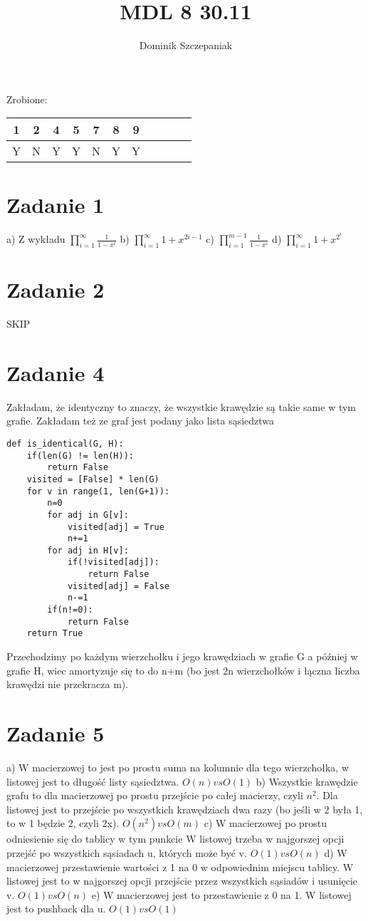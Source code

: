 \documentclass[12pt]{article}
\title{MDL 8 30.11}
\author{Dominik Szczepaniak}
\begin{document}
\maketitle
Zrobione:
\begin{tabular}{|| c c c c c c c c c c c||}
    \hline
    1 & 2 & 4 & 5 & 7 & 8 & 9   \\
    \hline
    Y & N & Y & Y & N & Y & Y 
\end{tabular}

\bgroup\obeylines
\section{Zadanie 1}
a) Z wykładu $\prod_{i=1}^{\infty} {\frac{1}{1-x^i}}$
b) $\prod_{i=1}^{\infty} {{1+x^{2i-1}}}$
c) $\prod_{i=1}^{m-1} {\frac{1}{1-x^i}}$
d) $\prod_{i=1}^{\infty} {{1+x^{2^i}}}$
\section{Zadanie 2}
SKIP
\section{Zadanie 4}
Zakładam, że identyczny to znaczy, że wszystkie krawędzie są takie same w tym grafie.
Zakładam też ze graf jest podany jako lista sąsiedztwa
\begin{lstlisting}
def is_identical(G, H):
    if(len(G) != len(H)):
        return False
    visited = [False] * len(G)
    for v in range(1, len(G+1)):
        n=0
        for adj in G[v]:
            visited[adj] = True 
            n+=1
        for adj in H[v]:
            if(!visited[adj]):
                return False
            visited[adj] = False 
            n-=1
        if(n!=0):
            return False
    return True
\end{lstlisting}
Przechodzimy po każdym wierzchołku i jego krawędziach w grafie G a później w grafie H, wiec amortyzuje się to do n+m (bo jest 2n wierzchołków i łączna liczba krawędzi nie przekracza m).

\section{Zadanie 5}
a) 
W macierzowej to jest po prostu suma na kolumnie dla tego wierzchołka, w listowej jest to długość listy sąsiedztwa.
$O(n) vs O(1)$
b)
Wszystkie krawędzie grafu to dla macierzowej po prostu przejście po całej macierzy, czyli $n^2$.
Dla listowej jest to przejście po wszystkich krawędziach dwa razy (bo jeśli w 2 była 1, to w 1 będzie 2, czyli 2x).
$O(n^2) vs O(m)$
c)
W macierzowej po prostu odniesienie się do tablicy w tym punkcie
W listowej trzeba w najgorszej opcji przejść po wszystkich sąsiadach u, których może być v.
$O(1) vs O(n)$
d)
W macierzowej przestawienie wartości z 1 na 0 w odpowiednim miejscu tablicy.
W listowej jest to w najgorszej opcji przejście przez wszystkich sąsiadów i usunięcie v.
$O(1) vs O(n)$
e) 
W macierzowej jest to przestawienie z 0 na 1.
W listowej jest to pushback dla u.
$O(1) vs O(1)$
\end{document}
